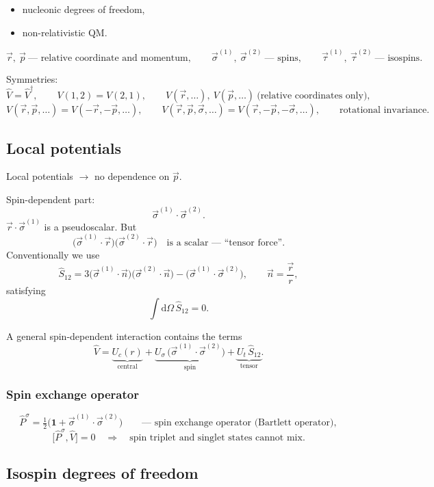 \documentclass[11pt,a4paper]{article}
\newcommand{\op}[1]{\hat{#1}}
\newcommand{\ud}{\mathrm{d}}
\begin{document}
\begin{itemize}
\item nucleonic degrees of freedom,
\item non-relativistic QM.
\end{itemize}

\[
\vec r,\ \vec p \ \text{--- relative coordinate and momentum},\qquad
\vec\sigma^{(1)},\ \vec\sigma^{(2)} \ \text{--- spins},\qquad
\vec\tau^{(1)},\ \vec\tau^{(2)} \ \text{--- isospins}.
\]

Symmetries:
\[
\op V=\op V^\dagger,\qquad
V(1,2)=V(2,1),\qquad
V(\vec r,\dots),\ V(\vec p,\dots)\ \text{(relative coordinates only)},
\]
\[
V(\vec r,\vec p,\dots)=V(-\vec r,-\vec p,\dots),\qquad
V(\vec r,\vec p,\vec\sigma,\dots)=V(\vec r,-\vec p,-\vec\sigma,\dots),\qquad
\text{rotational invariance}.
\]

\subsection{Local potentials}

Local potentials $\to$ no dependence on $\vec p$.

Spin-dependent part:
\[
\vec\sigma^{(1)}\!\cdot\vec\sigma^{(2)} .
\]
$\vec r\cdot\vec\sigma^{(1)}$ is a pseudoscalar. But
\[
\big(\vec\sigma^{(1)}\!\cdot\vec r\big)\big(\vec\sigma^{(2)}\!\cdot\vec r\big)
\quad\text{is a scalar --- ``tensor force''.}
\]
Conventionally we use
\[
\op S_{12}=3\big(\vec\sigma^{(1)}\!\cdot\vec n\big)\big(\vec\sigma^{(2)}\!\cdot\vec n\big)
-\big(\vec\sigma^{(1)}\!\cdot\vec\sigma^{(2)}\big),
\qquad \vec n=\frac{\vec r}{r},
\]
satisfying
\[
\int\!\ud\Omega\,\op S_{12}=0 .
\]

A general spin-dependent interaction contains the terms
\[
\op V=\underbrace{U_c(r)}_{\text{central}}
+\underbrace{U_\sigma\,\big(\vec\sigma^{(1)}\!\cdot\vec\sigma^{(2)}\big)}_{\text{spin}}
+\underbrace{U_t\,\op S_{12}}_{\text{tensor}} .
\]

\subsubsection*{Spin exchange operator}

\[
\op P^\sigma=\tfrac12\big(\mathbf 1+\vec\sigma^{(1)}\!\cdot\vec\sigma^{(2)}\big)
\qquad\text{--- spin exchange operator (Bartlett operator)},
\]
\[
\big[\op P^\sigma,\op V\big]=0
\quad\Rightarrow\quad
\text{spin triplet and singlet states cannot mix.}
\]

\subsection{Isospin degrees of freedom}
\end{document}
